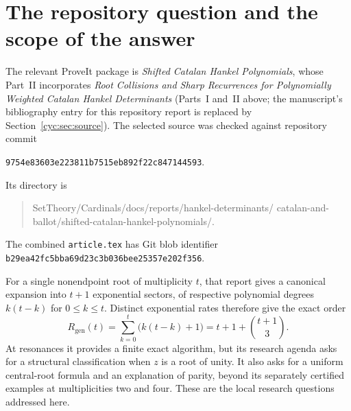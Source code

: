 \documentclass[11pt,a4paper]{article}
\numberwithin{equation}{section}
\theoremstyle{definition}
\theoremstyle{remark}
\newcommand{\Rgen}{R_{\mathrm{gen}}}
\begin{document}
\section{The repository question and the scope of the answer}\label{cyc:sec:scope}

The relevant ProveIt package is \emph{Shifted Catalan Hankel
Polynomials}, whose Part~II incorporates \emph{Root Collisions and
Sharp Recurrences for Polynomially Weighted Catalan Hankel
Determinants} (Parts~I and~II above; the manuscript's bibliography
entry for this repository report is replaced by
Section~\ref{cyc:sec:source}).  The selected source was checked against
repository commit
\begin{center}\small\texttt{9754e83603e223811b7515eb892f22c847144593}.\end{center}
Its directory is
\begin{quote}\small\ttfamily\raggedright
SetTheory/Cardinals/docs/reports/hankel-determinants/\allowbreak
catalan-and-ballot/\allowbreak shifted-catalan-hankel-polynomials/.
\end{quote}
The combined \texttt{article.tex} has Git blob identifier
\texttt{b29ea42fc5bba69d23c3b036bee25357e202f356}.

For a single nonendpoint root of multiplicity $t$, that report gives a
canonical expansion into $t+1$ exponential sectors, of respective
polynomial degrees $k(t-k)$ for $0\le k\le t$.  Distinct exponential
rates therefore give the exact order
\begin{equation}\label{cyc:eq:generic}
 \Rgen(t)=\sum_{k=0}^{t}\bigl(k(t-k)+1\bigr)
         =t+1+\binom{t+1}{3}.
\end{equation}
At resonances it provides a finite exact algorithm, but its research
agenda asks for a structural classification when $z$ is a root of
unity.  It also asks for a uniform central-root formula and an
explanation of parity, beyond its separately certified examples at
multiplicities two and four.  These are the local research questions
addressed here.

\end{document}

